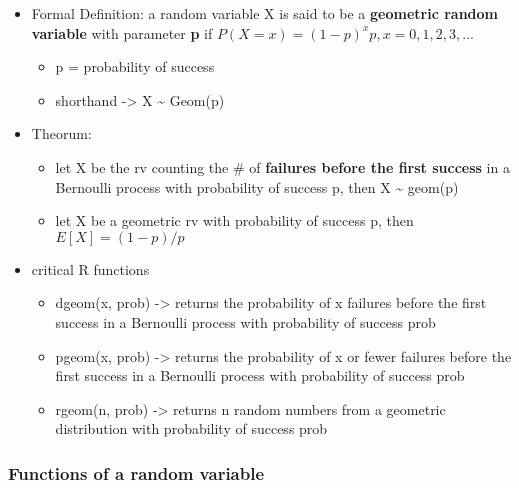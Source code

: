 \documentclass[
]{article}
\providecommand{\tightlist}{%
  \setlength{\itemsep}{0pt}\setlength{\parskip}{0pt}}
\begin{document}
\begin{itemize}
  \begin{itemize}
  \tightlist
  \item
    Formal Definition: a random variable X is said to be a
    \textbf{geometric random variable} with parameter \textbf{p} if
    \(P(X = x) = (1-p)^{x}p, x = 0, 1, 2, 3, ...\)

    \begin{itemize}
    \tightlist
    \item
      p = probability of success
    \item
      shorthand -\textgreater{} X \textasciitilde{} Geom(p)
    \end{itemize}
  \item
    Theorum:

    \begin{itemize}
    \tightlist
    \item
      let X be the rv counting the \# of \textbf{failures before the
      first success} in a Bernoulli process with probability of success
      p, then X \textasciitilde{} geom(p)
    \item
      let X be a geometric rv with probability of success p, then
      \(E[X] = (1-p)/p\)
    \end{itemize}
  \item
    critical R functions

    \begin{itemize}
    \tightlist
    \item
      dgeom(x, prob) -\textgreater{} returns the probability of x
      failures before the first success in a Bernoulli process with
      probability of success prob
    \item
      pgeom(x, prob) -\textgreater{} returns the probability of x or
      fewer failures before the first success in a Bernoulli process
      with probability of success prob
    \item
      rgeom(n, prob) -\textgreater{} returns n random numbers from a
      geometric distribution with probability of success prob
    \end{itemize}
  \end{itemize}
\end{itemize}

\hypertarget{functions-of-a-random-variable}{%
\subsubsection{Functions of a random
variable}\label{functions-of-a-random-variable}}
\end{document}
